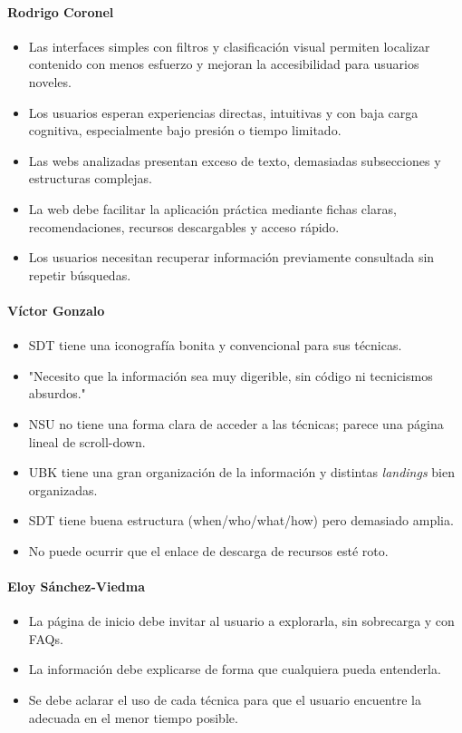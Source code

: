 \documentclass[12pt, a4paper]{report}
\begin{document}
\paragraph{Rodrigo Coronel}
\begin{itemize}[nosep]
  \item Las interfaces simples con filtros y clasificación visual permiten localizar contenido con
    menos esfuerzo y mejoran la accesibilidad para usuarios noveles.
  \item Los usuarios esperan experiencias directas, intuitivas y con baja carga cognitiva, especialmente
    bajo presión o tiempo limitado.
  \item Las webs analizadas presentan exceso de texto, demasiadas subsecciones y estructuras complejas.
  \item La web debe facilitar la aplicación práctica mediante fichas claras, recomendaciones, recursos
    descargables y acceso rápido.
  \item Los usuarios necesitan recuperar información previamente consultada sin repetir búsquedas.
\end{itemize}

\paragraph{Víctor Gonzalo}
\begin{itemize}[nosep]
  \item SDT tiene una iconografía bonita y convencional para sus técnicas.
  \item "Necesito que la información sea muy digerible, sin código ni tecnicismos absurdos."
  \item NSU no tiene una forma clara de acceder a las técnicas; parece una página lineal de scroll-down.
  \item UBK tiene una gran organización de la información y distintas \textit{landings} bien organizadas.
  \item SDT tiene buena estructura (when/who/what/how) pero demasiado amplia.
  \item No puede ocurrir que el enlace de descarga de recursos esté roto.
\end{itemize}

\paragraph{Eloy Sánchez-Viedma}
\begin{itemize}[nosep]
  \item La página de inicio debe invitar al usuario a explorarla, sin sobrecarga y con FAQs.
  \item La información debe explicarse de forma que cualquiera pueda entenderla.
  \item Se debe aclarar el uso de cada técnica para que el usuario encuentre la adecuada en el menor
    tiempo posible.
\end{itemize}
\end{document}
